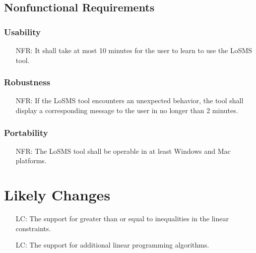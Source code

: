 \documentclass[12pt]{article}
\newcounter{reqnum} %
\newcounter{nfreqnum} %
\newcounter{lcnum} %
\newcommand{\famname}{LoSMS} %
\begin{document}
\subsection{Nonfunctional Requirements}

\subsubsection*{Usability}

\noindent 
\begin{itemize}
	\item[NFR\refstepcounter{nfreqnum}\thenfreqnum \label{usability}:] It shall 
	take at most 10 minutes for the user to learn to use the \famname{} tool.
\end{itemize}

\subsubsection*{Robustness}

\begin{itemize}
	\item[NFR\refstepcounter{nfreqnum}\thenfreqnum \label{robustness}:] If the 
	\famname{} tool encounters an unexpected behavior, the tool shall display 
	a corresponding message to the user in no longer than 2 minutes.
\end{itemize}

\subsubsection*{Portability}

\begin{itemize}
	\item[NFR\refstepcounter{nfreqnum}\thenfreqnum \label{portability}:] The 
	\famname{} tool shall be operable in at least Windows and Mac platforms.
\end{itemize}

\section{Likely Changes} \label{Sec_LikelyChanges} 

\noindent 
\begin{itemize}
	\item[LC\refstepcounter{lcnum}\thelcnum\label{LC_inequalities}:] The 
	support for greater than or equal to inequalities in the linear constraints.
	
	\item[LC\refstepcounter{lcnum}\thelcnum\label{LC_moreAlgorithms}:] The 
	support for additional linear programming algorithms.  
\end{itemize}
\end{document}
